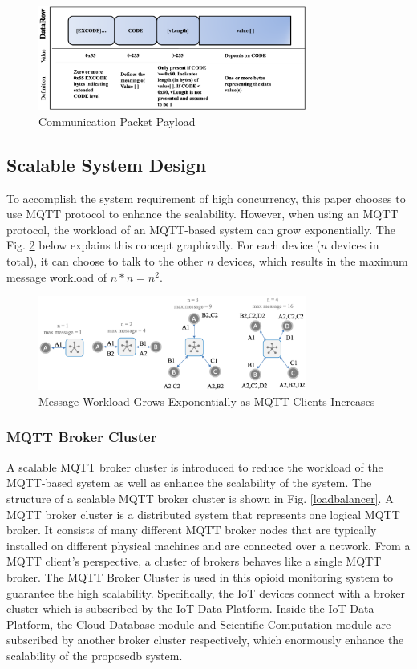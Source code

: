 \documentclass[conference]{IEEEtran}
\begin{document}
\begin{figure}[htbp]
	\centering
	\includegraphics[width=250pt]{payload.png}
	\caption{Communication Packet Payload}
	\label{payload}
	\end{figure}

\subsection{Scalable System Design}

To accomplish the system requirement of high concurrency, this paper chooses to use MQTT protocol to enhance the scalability. However, when using an MQTT protocol, the workload of an MQTT-based system can grow exponentially. The Fig. \ref{mqtt} below explains this concept graphically. For each device ($n$ devices in total), it can choose to talk to the other $n$ devices, which results in the maximum message workload of $n*n=n^2$.

\begin{figure}[htbp]
\centering
\includegraphics[width=250pt]{mqtt.png}
\caption{Message Workload Grows Exponentially as MQTT Clients Increases}
\label{mqtt}
\end{figure}

\subsubsection{MQTT Broker Cluster}

A scalable MQTT broker cluster is introduced to reduce the workload of the MQTT-based system as well as enhance the scalability of the system. The structure of a scalable MQTT broker cluster is shown in Fig. \ref{loadbalancer}. A MQTT broker cluster is a distributed system that represents one logical MQTT broker. It consists of many different MQTT broker nodes that are typically installed on different physical machines and are connected over a network. From a MQTT client’s perspective, a cluster of brokers behaves like a single MQTT broker. The MQTT Broker Cluster is used in this opioid monitoring system to guarantee the high scalability. Specifically, the IoT devices connect with a broker cluster which is subscribed by the IoT Data Platform. Inside the IoT Data Platform, the Cloud Database module and Scientific Computation module are subscribed by another broker cluster respectively, which enormously enhance the scalability of the proposedb system.
\end{document}
